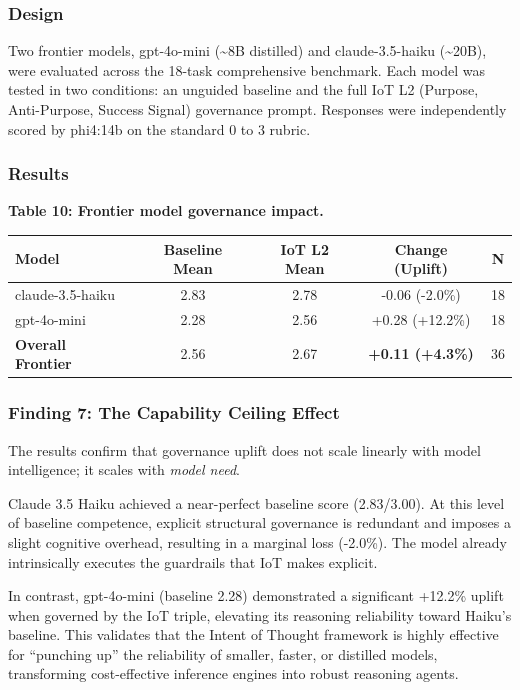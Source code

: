 \documentclass[11pt,a4paper]{article}
\begin{document}
\subsubsection{Design}\label{design-2}

Two frontier models, gpt-4o-mini (\textasciitilde8B distilled) and
claude-3.5-haiku (\textasciitilde20B), were evaluated across the 18-task
comprehensive benchmark. Each model was tested in two conditions: an
unguided baseline and the full IoT L2 (Purpose, Anti-Purpose, Success
Signal) governance prompt. Responses were independently scored by
phi4:14b on the standard 0 to 3 rubric.

\subsubsection{Results}\label{results-3}

\textbf{Table 10: Frontier model governance impact.}

{\small\begin{longtable}[]{@{}lcccc@{}}
\toprule\noalign{}
Model & Baseline Mean & IoT L2 Mean & Change (Uplift) & N \\
\midrule\noalign{}
\endhead
\bottomrule\noalign{}
\endlastfoot
claude-3.5-haiku & 2.83 & 2.78 & -0.06 (-2.0\%) & 18 \\
gpt-4o-mini & 2.28 & 2.56 & +0.28 (+12.2\%) & 18 \\
\textbf{Overall Frontier} & 2.56 & 2.67 & \textbf{+0.11 (+4.3\%)} &
36 \\
\end{longtable}}

\subsubsection{Finding 7: The Capability Ceiling
Effect}\label{finding-7-the-capability-ceiling-effect}

The results confirm that governance uplift does not scale linearly with
model intelligence; it scales with \emph{model need}.

Claude 3.5 Haiku achieved a near-perfect baseline score (2.83/3.00). At
this level of baseline competence, explicit structural governance is
redundant and imposes a slight cognitive overhead, resulting in a
marginal loss (-2.0\%). The model already intrinsically executes the
guardrails that IoT makes explicit.

In contrast, gpt-4o-mini (baseline 2.28) demonstrated a significant
+12.2\% uplift when governed by the IoT triple, elevating its reasoning
reliability toward Haiku's baseline. This validates that the Intent of
Thought framework is highly effective for ``punching up'' the
reliability of smaller, faster, or distilled models, transforming
cost-effective inference engines into robust reasoning agents.
\end{document}
